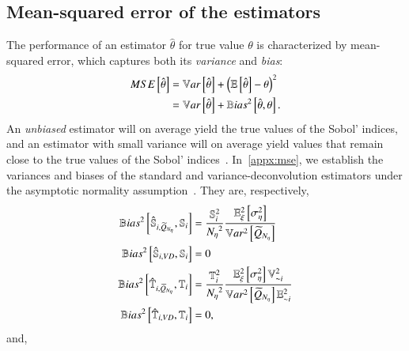 \subsection{Mean-squared error of the estimators} 
The performance of an estimator $\hat{\theta}$ for true value $\theta$ is characterized by mean-squared error, which captures both its \emph{variance} and \emph{bias}:
\begin{align*}
    MSE \left[ \hat{\theta} \right] &= \mathbb{V}ar\left[\hat{\theta}\right] + \left(\mathbb{E}\left[\hat{\theta}\right] - \theta \right) ^2 \\
    &= \mathbb{V}ar\left[\hat{\theta}\right] + \mathbb{B}ias^2 \left[ \hat{\theta}, \theta \right] .
\end{align*}
An \emph{unbiased} estimator will on average yield the true values of the Sobol' indices, and an estimator with small variance will on average yield values that remain close to the true values of the Sobol' indices~\cite{azzini-etal-2021}.
In~\ref{appx:mse}, we establish the variances and biases of the standard and variance-deconvolution estimators under the asymptotic normality assumption~\cite{vandervaart-2000, janon-etal-2014, azzini-etal-2021}.
They are, respectively,
\begin{align} \label{m4eq:bias-s-stan}
    \mathbb{B}ias^2 \left[ \hat{\mathbb{S}}_{i, \widetilde{Q}_{{N_\eta}}}, \mathbb{S}_{i} \right] &= \frac{\mathbb{S}_{i}^2}{{N_\eta}^2} \frac{\mathbb{E}_\xi ^2 \left[\sigma^2_\eta\right]}{\mathbb{V}ar^2\left[\widetilde{Q}_{{N_\eta}}\right]} \\
    \mathbb{B}ias^2 \left[ \hat{\mathbb{S}}_{i, VD}, \mathbb{S}_{i} \right] &= 0 \\ \label{m4eq:bias-t-stan}
    \mathbb{B}ias^2 \left[ \hat{\mathbb{T}}_{i, \widetilde{Q}_{{N_\eta}}}, \mathbb{T}_{i} \right] &= \frac{\mathbb{T}_{i}^2}{{N_\eta}^2} \frac{\mathbb{E}_\xi ^2 \left[\sigma^2_\eta\right] \mathbb{V}_{{\sim i}}^2}{\mathbb{V}ar^2\left[\widetilde{Q}_{{N_\eta}}\right] \mathbb{E}_{{\sim i}}^2} \\
    \mathbb{B}ias^2 \left[ \hat{\mathbb{T}}_{i, VD}, \mathbb{T}_{i} \right] &= 0 ,
\end{align}
and,

